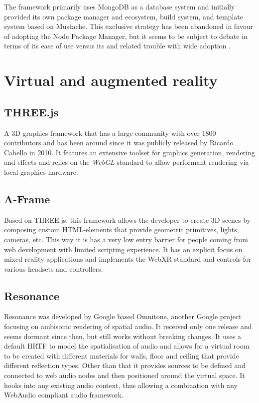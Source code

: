 The framework primarily uses MongoDB as a database system and initially provided its own package manager and ecosystem, build system, and template system based on Mustache. This exclusive strategy has been abandoned in favour of adopting the Node Package Manager, but it seems to be subject to debate in terms of its ease of use versus its  and related trouble with wide adoption \parencite{meteorDiscussionYCombinator}.



\section{Virtual and augmented reality}

\subsection{THREE.js}

A \ac{3D} graphics framework that has a large community with over 1800 contributors and has been around since it was publicly released by Ricardo Cabello in 2010. It features an extensive toolset for graphics generation, rendering and effects and relies on the \emph{WebGL} standard to allow performant rendering via local graphics hardware.

\subsection{A-Frame}

Based on THREE.js, this framework allows the developer to create \ac{3D} scenes by composing custom HTML-elements that provide geometric primitives, lights, cameras, etc. This way it is has a very low entry barrier for people coming from web development with limited scripting experience. It has an explicit focus on mixed reality applications and implements the WebXR standard and controls for various headsets and controllers.

\subsection{Resonance}

Resonance was developed by Google based Omnitone, another Google project focusing on ambisonic rendering of spatial audio. It received only one release and seems dormant since then, but still works without breaking changes. It uses a default \ac{HRTF} to model the spatialisation of audio and allows for a virtual room to be created with different materials for walls, floor and ceiling that provide different reflection types. Other than that it provides sources to be defined and connected to web audio nodes and then positioned around the virtual space. It hooks into any existing audio context, thus allowing a combination with any WebAudio compliant audio framework.

